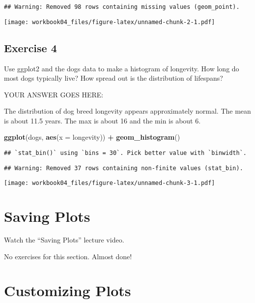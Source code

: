 \documentclass[
]{article}
\newenvironment{Shaded}{\begin{snugshade}}{\end{snugshade}}
\newcommand{\DataTypeTok}[1]{\textcolor[rgb]{0.13,0.29,0.53}{#1}}
\newcommand{\KeywordTok}[1]{\textcolor[rgb]{0.13,0.29,0.53}{\textbf{#1}}}
\newcommand{\NormalTok}[1]{#1}
\newcommand{\OperatorTok}[1]{\textcolor[rgb]{0.81,0.36,0.00}{\textbf{#1}}}
\newcommand{\StringTok}[1]{\textcolor[rgb]{0.31,0.60,0.02}{#1}}
\begin{document}
\begin{verbatim}
## Warning: Removed 98 rows containing missing values (geom_point).
\end{verbatim}

\texttt{[image: workbook04\_files/figure-latex/unnamed-chunk-2-1.pdf]}

\hypertarget{exercise-4}{%
\subsection{Exercise 4}\label{exercise-4}}

Use ggplot2 and the dogs data to make a histogram of longevity. How long
do most dogs typically live? How spread out is the distribution of
lifespans?

YOUR ANSWER GOES HERE:

The distribution of dog breed longevity appears approximately normal.
The mean is about 11.5 years. The max is about 16 and the min is about
6.

\begin{Shaded}
\begin{Highlighting}[]
\KeywordTok{ggplot}\NormalTok{(dogs, }\KeywordTok{aes}\NormalTok{(}\DataTypeTok{x =}\NormalTok{ longevity)) }\OperatorTok{+}\StringTok{ }\KeywordTok{geom\_histogram}\NormalTok{()}
\end{Highlighting}
\end{Shaded}

\begin{verbatim}
## `stat_bin()` using `bins = 30`. Pick better value with `binwidth`.
\end{verbatim}

\begin{verbatim}
## Warning: Removed 37 rows containing non-finite values (stat_bin).
\end{verbatim}

\texttt{[image: workbook04\_files/figure-latex/unnamed-chunk-3-1.pdf]}

\hypertarget{saving-plots}{%
\section{Saving Plots}\label{saving-plots}}

Watch the ``Saving Plots'' lecture video.

No exercises for this section. Almost done!

\hypertarget{customizing-plots}{%
\section{Customizing Plots}\label{customizing-plots}}
\end{document}
